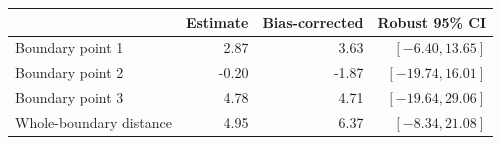 \begin{center}
\small\renewcommand{\arraystretch}{1.3}
\begin{tabular}{@{}lrrr@{}}\toprule
 & Estimate & Bias-corrected & Robust 95\% CI\\\midrule
Boundary point 1 & 2.87 & 3.63 & $[-6.40, 13.65]$\\
Boundary point 2 & -0.20 & -1.87 & $[-19.74, 16.01]$\\
Boundary point 3 & 4.78 & 4.71 & $[-19.64, 29.06]$\\
Whole-boundary distance & 4.95 & 6.37 & $[-8.34, 21.08]$\\
\bottomrule\end{tabular}
\end{center}
